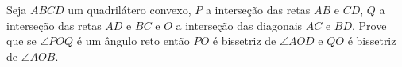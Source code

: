 Seja $ABCD$ um quadrilátero convexo, $P$ a interseção das retas $AB$ e $CD$, $Q$ a interseção das retas $AD$ e $BC$ e $O$ a interseção das diagonais $AC$ e $BD$.
Prove que se $\angle POQ$ é um ângulo reto então $PO$ é bissetriz de $\angle AOD$ e $QO$ é bissetriz de $\angle AOB$.